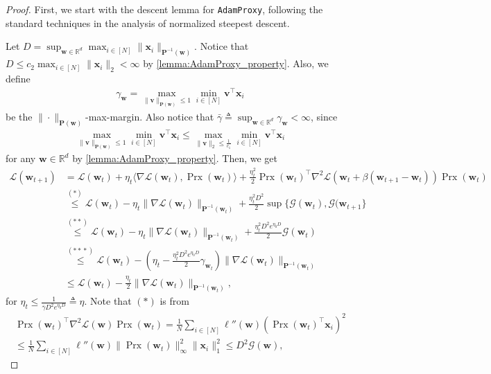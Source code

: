 \documentclass{article} %
\theoremstyle{plain}
\theoremstyle{definition}
\theoremstyle{remark}
\def\bigopen#1{\left(#1\right)}
\def\gG{{\mathcal{G}}}
\newcommand{\Ls}{\mathcal{L}}
\newcommand{\R}{\mathbb{R}}
\def\bx{{\mathbf x}}
\def\bP{{\mathbf P}}
\def\bw{{\mathbf w}}
\def\bv{{\mathbf v}}
\DeclareMathOperator{\proxy}{Prx}
\begin{document}
\AdamProxyMinimizesLoss*
\begin{proof}
First, we start with the descent lemma for \texttt{AdamProxy}, following the standard techniques in the analysis of normalized steepest descent.

    Let $D = \sup_{\bw\in\R^d} \max_{i \in [N]} \|\bx_i\|_{\bP^{-1}(\bw)}$. Notice that $D \leq c_2 \max_{i \in [N]} \|\bx_i\|_2 < \infty$ by \cref{lemma:AdamProxy_property}. Also, we define 
    \begin{align*}
        \gamma_\bw =\max_{\|\bv\|_{\bP(\bw)}\leq1} \min_{i \in [N]}\bv^\top\bx_i
    \end{align*}
    be the $\|\cdot\|_{\bP(\bw)}$-max-margin. Also notice that $\bar{\gamma}\triangleq\sup_{\bw \in \R^d} \gamma_\bw <\infty$, since
    \begin{align*}
        \max_{\|\bv\|_{\bP(\bw)}\leq1} \min_{i \in [N]}\bv^\top\bx_i \leq \max_{\|\bv\|_2 \leq \frac{1}{c_1}} \min_{i \in [N]}\bv^\top\bx_i
    \end{align*}
    for any $\bw \in \R^d$ by \cref{lemma:AdamProxy_property}. Then, we get
    \begin{align*}
        \Ls(\bw_{t+1}) &= \Ls(\bw_t) + \eta_t \langle\nabla \Ls(\bw_t), \proxy(\bw_t) \rangle + \frac{\eta_t^2}{2}\proxy(\bw_t)^\top \nabla^2\Ls(\bw_t + \beta(\bw_{t+1} - \bw_t)) \proxy(\bw_t) \\
        &\overset{(*)}{\leq} \Ls(\bw_t) - \eta_t \|\nabla\Ls(\bw_t)\|_{\bP^{-1}(\bw_t)} + \frac{\eta_t^2D^2}{2}\sup\{\gG(\bw_t), \gG(\bw_{t+1}\} \\
        &\overset{(**)}{\leq} \Ls(\bw_t) - \eta_t\|\nabla\Ls(\bw_t)\|_{\bP^{-1}(\bw_t)} + \frac{\eta_t^2D^2e^{\eta_0D}}{2}\gG(\bw_t) \\
        &\overset{({**}*)}{\leq} \Ls(\bw_t) - \bigopen{\eta_t - \frac{\eta_t^2D^2e^{\eta_0D}}{2} \gamma_{\bw_t}} \|\nabla\Ls(\bw_t)\|_{\bP^{-1}(\bw_t)} \\
        & \leq \Ls(\bw_t) - \frac{\eta_t}{2}\|\nabla\Ls(\bw_t)\|_{\bP^{-1}(\bw_t)},
    \end{align*}
    for $\eta_t \leq \frac{1}{\bar{\gamma} D^2e^{\eta_0D}} \triangleq \eta$. Note that $(*)$ is from 
    \begin{align*}
        \proxy(\bw_t)^\top \nabla^2\Ls(\bw) \proxy(\bw_t) = \frac1N \sum_{i\in [N]} \ell''(\bw) (\proxy(\bw_t)^\top \bx_i)^2 \\\leq \frac{1}{N} \sum_{i\in [N]} \ell''(\bw) \|\proxy(\bw_t)\|_\infty^2 \|\bx_i\|_1^2 \leq D^2 \gG (\bw),
    \end{align*}

\end{proof}
\end{document}
